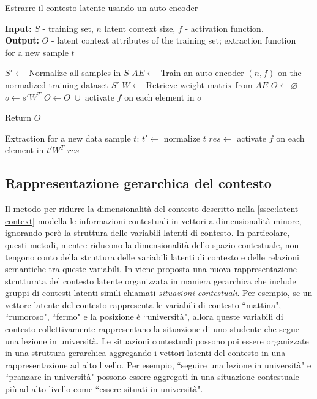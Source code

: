 \begin{algorithm}
\caption{Estrarre il contesto latente usando un auto-encoder \cite{latent-context}}
\label{alg:latent-context}
 \hspace*{\algorithmicindent} \textbf{Input:} $S$ - training set, $n$ latent context size, $f$ - activation function.\\
 \hspace*{\algorithmicindent} \textbf{Output:} $O$ - latent context attributes of the training set; extraction function\\ 
 \hspace*{\algorithmicindent} for a new sample $t$
\begin{algorithmic}[1]
\STATE $S' \leftarrow$ Normalize all samples in $S$
\STATE $AE \leftarrow$ Train an auto-encoder $(n,f)$ on the normalized training dataset $S'$
\STATE $W \leftarrow$ Retrieve weight matrix from $AE$
\STATE $O \leftarrow \varnothing$
	\STATE $o \leftarrow s'W^T$
	\STATE $O \leftarrow O \; \cup$ activate $f$ on each element in $o$ 
\ENDFOR

\STATE Return $O$

Extraction for a new data sample $t$:
\STATE $t' \leftarrow$ normalize $t$
\STATE $res \leftarrow$ activate $f$ on each element in $t'W^T$ 
\RETURN $res$

\end{algorithmic}
\end{algorithm}

\subsection{Rappresentazione gerarchica del contesto}
\label{ssec:hierarchical}
Il metodo per ridurre la dimensionalità del contesto descritto nella \autoref{ssec:latent-context} modella le informazioni contestuali in vettori a dimensionalità minore, ignorando però la struttura delle variabili latenti di contesto. In particolare, questi metodi, mentre riducono la dimensionalità dello spazio contestuale, non tengono conto della struttura delle variabili latenti di contesto e delle relazioni semantiche tra queste variabili. In \cite{hierarchical-context} viene proposta una nuova rappresentazione strutturata del contesto latente organizzata in maniera gerarchica che include gruppi di contesti latenti simili chiamati \textit{situazioni contestuali}. Per esempio, se un vettore latente del contesto rappresenta le variabili di contesto ``mattina", ``rumoroso", ``fermo" e la posizione è ``università", allora queste variabili di contesto collettivamente rappresentano la situazione di uno studente che segue una lezione in università. Le situazioni contestuali possono poi essere organizzate in una struttura gerarchica aggregando i vettori latenti del contesto in una rappresentazione ad alto livello. Per esempio, ``seguire una lezione in università" e ``pranzare in università" possono essere aggregati in una situazione contestuale più ad alto livello come ``essere situati in università".

